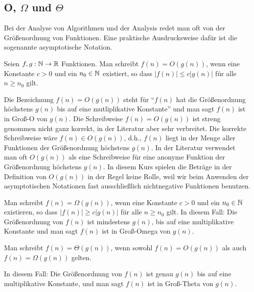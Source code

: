 \subsection{O, $\Omega$ und $\Theta$}

\begin{bem}
Bei der Analyse von Algorithmen und der Analysis redet man oft von der Größenordnung von Funktionen. Eine praktische Ausdrucksweise dafür ist die sogenannte asymptotische Notation.
\end{bem} 

\begin{defn}[$O$-Notation]  
Seien $f, g: \mathbb{N} \to \mathbb{R}$ Funktionen. 
Man schreibt $f(n) = O(g(n))$, wenn eine Konstante $c>0$ und ein $n_0 \in \mathbb{N}$ existiert, so dass $|f(n)| \le c |g(n)|$ für alle $n \ge n_0$ gilt. 
\end{defn} 

\begin{bem} 
Die Bezeichnung $f(n)=O(g(n))$ steht für ``$f(n)$ hat die Größenordnung höchstens $g(n)$ bis auf eine mutliplikative Konstante'' und man sagt \glqq$f(n)$ ist in Groß-O von $g(n)$\grqq. Die Schreibweise $f(n) = O(g(n))$ ist streng genommen nicht ganz korrekt, in der Literatur aber sehr verbreitet. Die korrekte Schreibweise wäre $f(n) \in O(g(n))$, d.h., $f(n)$ liegt in der Menge aller Funktionen der Größenordnung höchstens $g(n)$. In der Literatur verwendet man oft $O(g(n))$ als eine Schreibweise für eine anonyme Funktion der Größenordnung höchstens $g(n)$. In diesem Kurs spielen die Beträge in der Definition von $O(g(n))$ in der Regel keine Rolle, weil wir beim Anwenden der asymptotischen Notationen fast ausschließlich nichtnegative Funktionen benutzen. 
\end{bem} 

\begin{defn} 
Man schreibt $f(n) = \Omega(g(n))$, wenn eine Konstante $c>0$ und ein $n_0 \in \mathbb{N}$ existieren, so dass $|f(n)| \ge c |g(n)|$ für alle $n \ge n_0$ gilt. In diesem Fall: Die Größenordnung von $f(n)$ ist mindestens $g(n)$, bis auf eine multiplikative Konstante und man sagt \glqq$f(n)$ ist in Groß-Omega von $g(n)$\grqq. 
\end{defn} 

\begin{defn} 
Man schreibt $f(n) = \Theta(g(n))$, wenn sowohl $f(n) = O(g(n))$ als auch$f(n) = \Omega(g(n))$ gelten.
\end{defn} 

\begin{bem}
In diesem Fall: Die Größenordnung von $f(n)$ ist genau $g(n)$ bis auf eine multiplikative Konstante, und man sagt \glqq$f(n)$ ist in Groß-Theta von $g(n)$\grqq.
\end{bem} 

